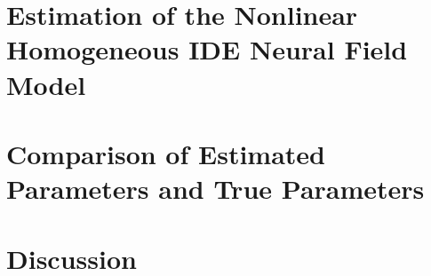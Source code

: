\documentclass[onecolumn,draftcls]{IEEEtran}
\begin{document}
\section{Estimation of the Nonlinear Homogeneous IDE Neural Field Model}


\section{Comparison of Estimated Parameters and True Parameters}

\section{Discussion}

%
%

%
%
%
\end{document}
